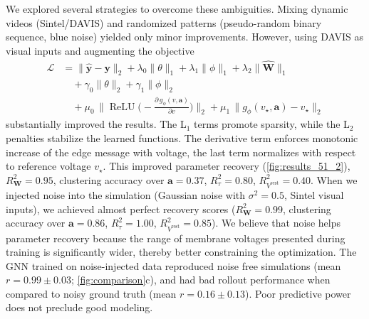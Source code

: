 \documentclass[12pt,twocolumn]{article}
\begin{document}
We explored several strategies to overcome these ambiguities.  Mixing dynamic videos (Sintel/DAVIS) and randomized patterns (pseudo-random binary sequence, blue noise) yielded only minor improvements.  However, using DAVIS as visual inputs and augmenting the objective
\small
\begin{equation*}
\begin{aligned}
\mathcal{L} &=
\|\widehat{\mathbf y}-\mathbf y\|_2
+ \lambda_0\|\theta\|_{1}
+ \lambda_1\|\phi\|_{1}
+ \lambda_2\|\widehat{\mathbf W}\|_{1} \\
&\quad
+ \gamma_0\|\theta\|_{2}
+ \gamma_1\|\phi\|_{2} \\
&\quad
+ \mu_0\,
\big\|\operatorname{ReLU}\!\big(-\tfrac{\partial\, g_\phi(v,\mathbf{a})}{\partial v}\big)\big\|_2
+ \mu_1\,
\|g_\phi(v_\star,\mathbf{a})-v_\star\|_2
\end{aligned}
\label{eq:regularization}
\end{equation*}
\normalsize%
substantially improved the results.
The L$_1$ terms promote sparsity, while the L$_2$ penalties stabilize the learned functions.  
The derivative term enforces monotonic increase of the edge message with voltage, the last term normalizes with respect to reference voltage $v_\star$. This improved parameter recovery (\cref{fig:results_51_2}), $R^2_{\mathbf{W}}=0.95$, clustering accuracy over $\mathbf{a}=0.37$, 
$R^2_{\tau}=0.80$, \mbox{$R^2_{V^{\mathrm{rest}}}=0.40$}.
When we injected noise into the simulation (Gaussian noise with $\sigma^2=0.5$, Sintel visual inputs), we achieved almost perfect recovery scores (\mbox{$R^2_{\mathbf{W}}=0.99$}, clustering accuracy over $\mathbf{a}=0.86$, \mbox{$R^2_{\tau}=1.00$}, \mbox{$R^2_{V^\mathrm{rest}} = 0.85$}).  We believe that noise helps parameter recovery because the range of membrane voltages presented during training is significantly wider, thereby better constraining the optimization. The GNN trained on noise-injected data reproduced noise free simulations (mean \(r=0.99 \pm 0.03\); \cref{fig:comparison}c), and had bad rollout performance when compared to noisy ground truth (mean \(r=0.16 \pm 0.13\)).  Poor predictive power does not preclude good modeling.  
\end{document}
